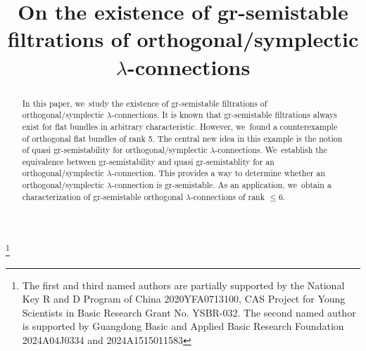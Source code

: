 \documentclass[JEP,XML,SOM,Unicode,published]{cedram}
\theoremstyle{plain}
\theoremstyle{definition}
\begin{document}
\frontmatter

\title[Existence of gr-semistable filtrations]{On the existence of gr-semistable filtrations of orthogonal/symplectic $\lambda$\protect\nobreakdash-con\-nections}

\author[\initial{M.} \lastname{Sheng}]{ }
\address{Yau Mathematical Science Center, Tsinghua University, \\
Beijing, 100084, China\\
\& Yanqi Lake Beijing Institute of Mathematical Sciences and Applications,\\
Beijing, 101408, China}
\urladdr{}

\author[\initial{H.} \lastname{Sun}]{ }
\address{Department of Mathematics, South China University of Technology, \\
Guangzhou, 510641, China}
\urladdr{}

\author[\initial{J.} \lastname{Wang}]{ }
\address{Yau Mathematical Science Center, Tsinghua University, \\
Beijing, 100084, China}
\urladdr{}

\thanks{The first and third named authors are partially supported by the National Key R and D Program of China 2020YFA0713100, CAS Project for Young Scientists in Basic Research Grant No. YSBR-032. The second named author is supported by Guangdong Basic and Applied Basic
Research Foundation 2024A04J0334 and 2024A1515011583}

\begin{abstract}
In this paper, we~study the existence of gr-semistable filtrations of orthogonal/symplectic $\lambda$-connections. It is known that gr-semistable filtrations always exist for flat bundles in arbitrary characteristic. However, we~found a counterexample of orthogonal flat bundles of rank 5. The central new idea in this example is the notion of quasi gr-semistability for orthogonal/symplectic $\lambda$-connections. We~establish the equivalence between gr-semistability and quasi gr-semistablity for an orthogonal/symplectic $\lambda$-connection. This provides a way to determine whether an orthogonal/symplectic $\lambda$-connection is gr-semistable. As an application, we~obtain a characterization of gr-semistable orthogonal $\lambda$-connections of rank $\leq 6$.
\end{abstract}
\end{document}
